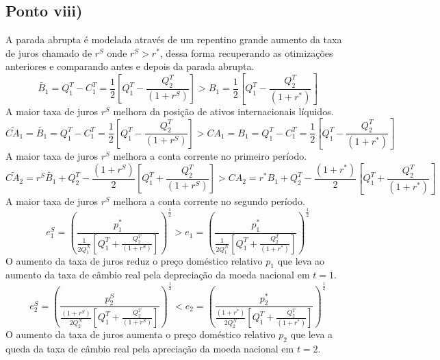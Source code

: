 \documentclass{article}
\begin{document}
\subsection*{Ponto viii)}
A parada abrupta é modelada através de um repentino grande aumento da taxa de juros chamado de $r^S$ onde $r^S>r^*$, dessa forma recuperando as otimizações anteriores e comparando antes e depois da parada abrupta.\\
\begin{equation*}
    \tilde{B_1}=Q_1^T-C_1^T=\frac{1}{2}\left[Q_1^T - \frac{Q_2^T}{(1+r^S)}\right] > B_1 =\frac{1}{2}\left[Q_1^T - \frac{Q_2^T}{(1+r^*)}\right]
\end{equation*}
A maior taxa de juros $r^S$ melhora da posição de ativos internacionais líquidos.
\begin{equation*}
    \tilde{CA_1}=\tilde{B_1}=Q_1^T-C_1^T=\frac{1}{2}\left[Q_1^T - \frac{Q_2^T}{(1+r^S)}\right] > CA_1=B_1=Q_1^T-C_1^T=\frac{1}{2}\left[Q_1^T - \frac{Q_2^T}{(1+r^*)}\right]
\end{equation*}
A maior taxa de juros $r^S$ melhora a conta corrente no primeiro período.
\begin{equation*}
    \tilde{CA_2}=r^S\tilde{B_1}+Q_2^T-\frac{(1+r^S)}{2}\left[Q_1^T + \frac{Q_2^T}{(1+r^S)}\right] > CA_2=r^*B_1+Q_2^T-\frac{(1+r^*)}{2}\left[Q_1^T + \frac{Q_2^T}{(1+r^*)}\right]
\end{equation*}
A maior taxa de juros $r^S$ melhora a conta corrente no segundo período.
\begin{equation*}
    e_1^S= \left(\frac{p_1^*}{\frac{1}{2Q_1^N}\left[Q_1^T + \frac{Q_2^T}{(1+r^S)}\right]}\right)^\frac{1}{2} > e_1= \left(\frac{p_1^*}{\frac{1}{2Q_1^N}\left[Q_1^T + \frac{Q_2^T}{(1+r^*)}\right]}\right)^\frac{1}{2}
\end{equation*}
O aumento da taxa de juros reduz o preço doméstico relativo $p_1$ que leva ao aumento da taxa de câmbio real pela depreciação da moeda nacional em $t=1$. 
\begin{equation*}
    e_2^S= \left(\frac{p_2^S}{\frac{(1+r^S)}{2Q_2^N}\left[Q_1^T + \frac{Q_2^T}{(1+r^S)}\right]}\right)^\frac{1}{2} < e_2= \left(\frac{p_2^*}{\frac{(1+r^*)}{2Q_2^N}\left[Q_1^T + \frac{Q_2^T}{(1+r^*)}\right]}\right)^\frac{1}{2}
\end{equation*}
O aumento da taxa de juros aumenta o preço doméstico relativo $p_2$ que leva a queda da taxa de câmbio real pela apreciação da moeda nacional em $t=2$. 
\end{document}

